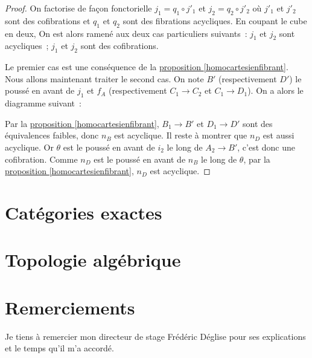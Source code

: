 \documentclass{amsart}
\newcommand{\sref}[2]{\hyperref[#2]{#1 \ref*{#2}}}
\theoremstyle{plain}
\theoremstyle{definition}
\theoremstyle{remark}
\newcommand{\ra}{\rightarrow}
\begin{document}
\begin{proof}
  On factorise de façon fonctorielle $j_1=q_1\circ j'_1$ et $j_2=q_2\circ j'_2$ où $j'_1$ et $j'_2$ sont des cofibrations
  et $q_1$ et $q_2$ sont des fibrations acycliques. En coupant le cube en deux, On est alors ramené aux deux cas particuliers suivants~:
  $j_1$ et $j_2$ sont acycliques~;
  $j_1$ et $j_2$ sont des cofibrations.

  Le premier cas est une conséquence de la \sref{proposition}{homocartesienfibrant}. Nous allons maintenant traiter le second cas.
  On note $B'$ (respectivement $D'$) le poussé en avant de $j_1$ et $f_A$ (respectivement $C_1\ra C_2$ et $C_1\ra D_1$).
  On a alors le diagramme suivant~:
  \begin{center}
  \end{center}
  Par la \sref{proposition}{homocartesienfibrant}, $B_1\ra B'$ et $D_1\ra D'$ sont des équivalences faibles, donc $n_B$ est acyclique.
  Il reste à montrer que $n_D$ est aussi acyclique.
  Or $\theta$ est le poussé en avant de $i_2$ le long de $A_2\ra B'$, c'est donc une cofibration. Comme $n_D$ est le poussé en avant de $n_B$ le long
  de $\theta$, par la \sref{proposition}{homocartesienfibrant}, $n_D$ est acyclique.
\end{proof}


\section{Catégories exactes}

\section{Topologie algébrique}

\section*{Remerciements} Je tiens à remercier mon directeur de stage Frédéric Déglise pour ses explications et le temps qu'il m'a accordé.
\nocite{*}




\end{document}
